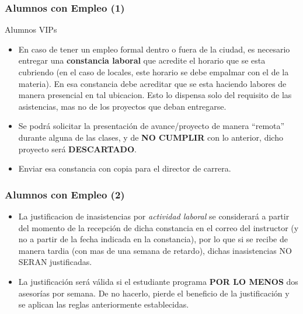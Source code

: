 \begin{frame}
\frametitle{Alumnos con Empleo (1)}
\begin{block}{Alumnos VIPs}
\begin{itemize}
\item En caso de tener un empleo formal dentro o fuera de la ciudad, es necesario entregar una \textbf{constancia laboral} que acredite el horario que se esta cubriendo (en el caso de locales, este horario se debe empalmar con el de la materia). En esa constancia debe acreditar que se esta haciendo labores de manera presencial en tal ubicacion. Esto lo dispensa solo del requisito de las asistencias, mas no de los proyectos que deban entregarse. 
\item Se podrá solicitar la presentación de avance/proyecto de manera ``remota'' durante alguna de las clases, y de \textbf{NO CUMPLIR} con lo anterior, dicho proyecto será \textbf{DESCARTADO}. 
\item Enviar esa constancia con copia para el director de carrera.
\end{itemize}
\end{block}
\end{frame}


\begin{frame}
\frametitle{Alumnos con Empleo (2)}
\begin{itemize}
\item La justificacion de inasistencias por \textit{actividad laboral} se considerar\'a a partir del momento de la recepci\'on de dicha constancia en el correo del instructor (y no a partir de la fecha indicada en la constancia), por lo que si se recibe de manera tardia (con mas de una semana de retardo), dichas inasistencias NO SERAN justificadas.
\item La justificación será válida si el estudiante programa \textbf{POR LO MENOS} dos asesorías por semana. De no hacerlo, pierde el beneficio de la justificación y se aplican las reglas anteriormente establecidas. 
\end{itemize}

\end{frame}







